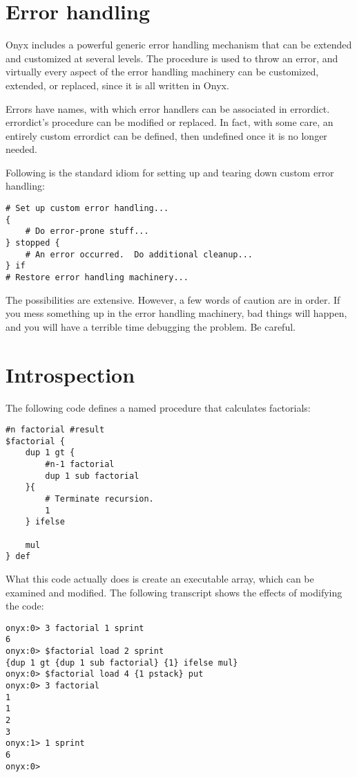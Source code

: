 \section{Error handling}
Onyx includes a powerful generic error handling mechanism that can be extended
and customized at several levels.  The
 procedure is used to throw an
error, and virtually every aspect of the error handling machinery can be
customized, extended, or replaced, since it is all written in Onyx.

Errors have names, with which error handlers can be associated in errordict.
errordict's  procedure
can be modified or replaced.  In fact, with some care, an entirely custom
errordict can be defined, then undefined once it is no longer needed.

Following is the standard idiom for setting up and tearing down custom error
handling:

\begin{verbatim}
# Set up custom error handling...
{
    # Do error-prone stuff...
} stopped {
    # An error occurred.  Do additional cleanup...
} if
# Restore error handling machinery...
\end{verbatim}

The possibilities are extensive.  However, a few words of caution are in order.
If you mess something up in the error handling machinery, bad things will
happen, and you will have a terrible time debugging the problem.  Be careful.

\section{Introspection}
\label{onyxtut:introspection}

The following code defines a named procedure that calculates factorials:

\begin{verbatim}
#n factorial #result
$factorial {
    dup 1 gt {
        #n-1 factorial
        dup 1 sub factorial
    }{
        # Terminate recursion.
        1
    } ifelse

    mul
} def
\end{verbatim}

What this code actually does is create an executable array, which can be
examined and modified.  The following transcript shows the effects of modifying
the code:

\begin{verbatim}
onyx:0> 3 factorial 1 sprint
6
onyx:0> $factorial load 2 sprint
{dup 1 gt {dup 1 sub factorial} {1} ifelse mul}
onyx:0> $factorial load 4 {1 pstack} put
onyx:0> 3 factorial
1
1
2
3
onyx:1> 1 sprint
6
onyx:0>
\end{verbatim}

